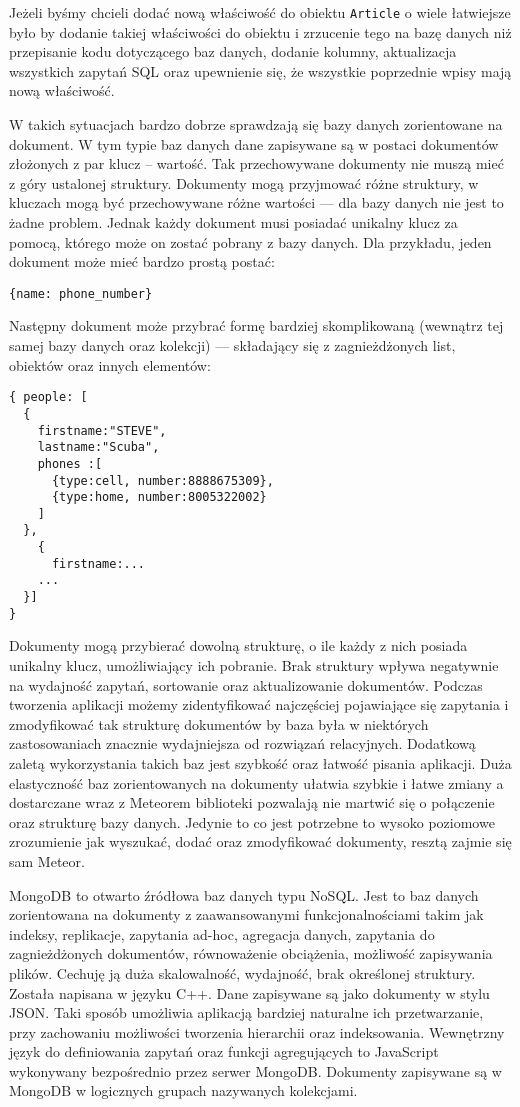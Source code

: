 Jeżeli byśmy chcieli dodać nową właściwość do obiektu \verb|Article| o wiele łatwiejsze było by dodanie takiej właściwości do obiektu i zrzucenie tego na bazę danych niż przepisanie kodu dotyczącego baz danych, dodanie kolumny, aktualizacja wszystkich zapytań SQL oraz upewnienie się, że wszystkie poprzednie wpisy mają nową właściwość. 

W takich sytuacjach bardzo dobrze sprawdzają się bazy danych zorientowane na dokument. W tym typie baz danych dane zapisywane są w postaci dokumentów złożonych z par klucz -- wartość. Tak przechowywane dokumenty nie muszą mieć z góry ustalonej struktury. Dokumenty mogą przyjmować różne struktury, w kluczach mogą być przechowywane różne wartości --- dla bazy danych nie jest to żadne problem. Jednak każdy dokument musi posiadać unikalny klucz za pomocą, którego może on zostać pobrany z bazy danych\cite{strack15}.
Dla przykładu, jeden dokument może mieć bardzo prostą postać:
\begin{verbatim}
{name: phone_number}
\end{verbatim}
Następny dokument może przybrać formę bardziej skomplikowaną (wewnątrz tej samej bazy danych oraz kolekcji) --- składający się z zagnieżdżonych list, obiektów oraz innych elementów\cite{strack15}:
\begin{verbatim}
{ people: [
  {
    firstname:"STEVE", 
    lastname:"Scuba", 
    phones :[
      {type:cell, number:8888675309},
      {type:home, number:8005322002}
    ]
  },
    {
      firstname:...
	...
  }]
}
\end{verbatim}
Dokumenty mogą przybierać dowolną strukturę, o ile każdy z nich posiada unikalny klucz, umożliwiający ich pobranie. Brak struktury wpływa negatywnie na wydajność zapytań, sortowanie oraz aktualizowanie dokumentów. Podczas tworzenia aplikacji możemy zidentyfikować najczęściej pojawiające się zapytania i zmodyfikować tak strukturę dokumentów by baza była w niektórych zastosowaniach znacznie wydajniejsza od rozwiązań relacyjnych. Dodatkową zaletą wykorzystania takich baz jest szybkość oraz łatwość pisania aplikacji\cite{strack15}.
Duża elastyczność baz zorientowanych na dokumenty ułatwia szybkie i łatwe zmiany a dostarczane wraz z Meteorem biblioteki pozwalają nie martwić się o połączenie oraz strukturę bazy danych. Jedynie to co jest potrzebne to wysoko poziomowe zrozumienie jak wyszukać, dodać oraz zmodyfikować dokumenty, resztą zajmie się sam Meteor.

MongoDB to otwarto źródłowa baz danych typu NoSQL. Jest to baz danych zorientowana na dokumenty z zaawansowanymi funkcjonalnościami takim jak indeksy, replikacje, zapytania ad-hoc, agregacja danych, zapytania do zagnieżdżonych dokumentów, równoważenie obciążenia, możliwość zapisywania plików. Cechuję ją duża skalowalność, wydajność, brak określonej struktury. Została napisana w języku C++. Dane zapisywane są jako dokumenty w stylu JSON. Taki sposób umożliwia aplikacją bardziej naturalne ich przetwarzanie, przy zachowaniu możliwości tworzenia hierarchii oraz indeksowania. Wewnętrzny język do definiowania zapytań oraz funkcji agregujących to JavaScript wykonywany bezpośrednio przez serwer MongoDB. Dokumenty zapisywane są w MongoDB w logicznych grupach nazywanych kolekcjami.


